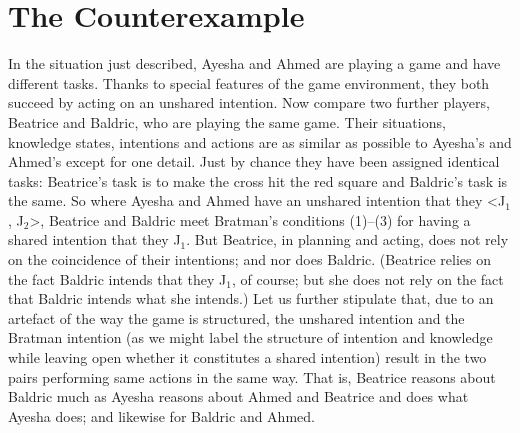 \documentclass[12pt,\papersize]{extarticle}
\begin{document}
%



\section{The Counterexample}
\label{sec:the_counterexample}

In the situation just described,
Ayesha and Ahmed are playing a game and have different tasks.
Thanks to special features of the game environment, they both succeed by acting on an unshared intention.
Now compare two further players, Beatrice and Baldric, who are playing the same game. 
Their situations, knowledge states, intentions and actions are as similar as possible to Ayesha's and Ahmed's except for one detail.
Just by chance they have been assigned identical tasks: Beatrice's task is to make the cross hit the red square and Baldric's task is the same.
So where Ayesha and Ahmed have an unshared intention that they <J$_1$, J$_2$>,
Beatrice and Baldric meet Bratman's conditions (1)--(3) for having a shared intention that they J$_1$.  
But Beatrice, in planning and acting, does not rely on the coincidence of their intentions; and nor does Baldric.
(Beatrice relies on the fact Baldric intends that they J$_1$, of course; but she does not rely on the fact that Baldric intends what she intends.) 
Let us further stipulate that, due to an artefact of the way the game is structured,
the unshared intention and the 
	Bratman intention 
	\label{df:bratman_intention}
	(as we might label the structure of intention and knowledge 
	while leaving open whether it constitutes a shared intention) result in the two pairs performing same actions in the same way.
That is, Beatrice reasons about Baldric much as Ayesha reasons about Ahmed and Beatrice and does what Ayesha does; and likewise for Baldric and Ahmed. 
\end{document}
